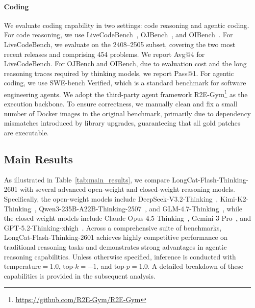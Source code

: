 \documentclass{article}
\newcommand{\longcat}{LongCat-Flash-Thinking-2601\xspace}
\begin{document}
\paragraph{Coding}
We evaluate coding capability in two settings: code reasoning and agentic coding.
For code reasoning, we use LiveCodeBench~\citep{LiveCodeBench}, OJBench~\citep{OJBench}, and OIBench~\citep{OIBench}.
For LiveCodeBench, we evaluate on the 2408–2505 subset, covering the two most recent releases and comprising 454 problems.
We report Avg@4 for LiveCodeBench.
For OJBench and OIBench, due to evaluation cost and the long reasoning traces required by thinking models, we report Pass@1.
For agentic coding, we use SWE-bench Verified, which is a standard benchmark for software engineering agents.
We adopt the third-party agent framework R2E-Gym\footnote{\url{https://github.com/R2E-Gym/R2E-Gym}} as the execution backbone.
To ensure correctness, we manually clean and fix a small number of Docker images in the original benchmark, primarily due to dependency mismatches introduced by library upgrades, guaranteeing that all gold patches are executable.

\subsection{Main Results}
As illustrated in Table~\ref{tab:main_results}, we compare \longcat with several advanced open-weight and closed-weight reasoning models. 
Specifically, the open-weight models include DeepSeek-V3.2-Thinking~\citep{DeepSeek-V3.2}, Kimi-K2-Thinking~\citep{Kimi_K2_web_doc}, Qwen3-235B-A22B-Thinking-2507~\citep{Qwen3}, and GLM-4.7-Thinking~\citep{GLM-4.7}, while the closed-weight models include Claude-Opus-4.5-Thinking~\citep{Claude-Opus-4.5}, Gemini-3-Pro~\citep{Gemini3}, and GPT-5.2-Thinking-xhigh~\citep{GPT-5.2}.
Across a comprehensive suite of benchmarks, \longcat achieves highly competitive performance on traditional reasoning tasks and demonstrates strong advantages in agentic reasoning capabilities.
Unless otherwise specified, inference is conducted with temperature$=1.0$, top-$k=-1$, and top-$p=1.0$.
A detailed breakdown of these capabilities is provided in the subsequent analysis.
\end{document}
